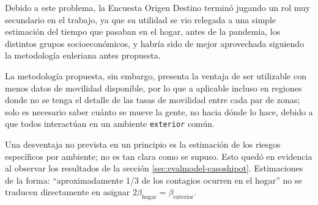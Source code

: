 Debido a este problema, la Encuesta Origen Destino terminó jugando un rol muy secundario en el trabajo, ya que su utilidad se vio relegada a una simple estimación del tiempo que pasaban en el hogar, antes de la pandemia, los distintos grupos socioeconómicos, y habría sido de mejor aprovechada siguiendo la metodología euleriana antes propuesta. 

La metodología propuesta, sin embargo, presenta la ventaja de ser utilizable con menos datos de movilidad disponible, por lo que a aplicable incluso en regiones donde no se tenga el detalle de las tasas de movilidad entre cada par de zonas; solo es necesario saber cuánto se mueve la gente, no hacia dónde lo hace, debido a que todos interactúan en un ambiente \texttt{exterior} común.

Una desventaja no prevista en un principio es la estimación de los riesgos específicos por ambiente; no es tan clara como se supuso. Esto quedó en evidencia al observar los resultados de la sección \ref{sec:evalmodel-casoshipot}. Estimaciones de la forma: ``aproximadamente 1/3 de los contagios ocurren en el hogar'' \cite{Ferguson2020} no se traducen directamente en asignar \( 2 \beta_{\text{hogar}} = \beta_{\text{exterior}}\).


